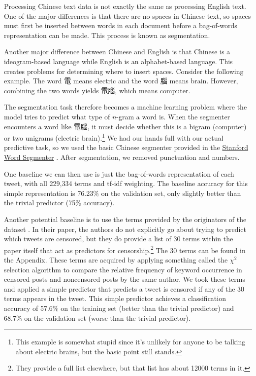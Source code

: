 \documentclass{sig-alternate-05-2015}
\begin{document}
Processing Chinese text data is not exactly the same as processing English text. One of the major differences is that there are no spaces in Chinese text, so spaces must first be inserted between words in each document before a bag-of-words representation can be made. This process is known as segmentation. 

Another major difference between Chinese and English is that Chinese is a ideogram-based language while English is an alphabet-based language. This creates problems for determining where to insert spaces. Consider the following example. The word 電 means electric and the word 腦 means brain. However, combining the two words yields 電腦, which means computer.

The segmentation task therefore becomes a machine learning problem where the model tries to predict what type of $n$-gram a word is. When the segmenter encounters a word like 電腦, it must decide whether this is a bigram (computer) or two unigrams (electric brain).\footnote{This example is somewhat stupid since it's unlikely for anyone to be talking about electric brains, but the basic point still stands.} We had our hands full with our actual predictive task, so we used the basic Chinese segmenter provided in the \href{http://nlp.stanford.edu/software/segmenter.shtml}{Stanford Word Segmenter} \cite{Chang2008}. After segmentation, we removed punctuation and numbers.

One baseline we can then use is just the bag-of-words representation of each tweet, with all 229,334 terms and tf-idf weighting. The baseline accuracy for this simple representation is 76.23\% on the validation set, only slightly better than the trivial predictor (75\% accuracy).

Another potential baseline is to use the terms provided by the originators of the dataset \cite{Fu2013a}. In their paper, the authors do not explicitly go about trying to predict which tweets are censored, but they do provide a list of 30 terms within the paper itself that act as predictors for censorship.\footnote{They provide a full list elsewhere, but that list has about 12000 terms in it.} The 30 terms can be found in the Appendix. These terms are acquired by applying something called the $\chi^2$ selection algorithm to compare the relative frequency of keyword occurrence in censored posts and noncensored posts by the same author. We took these terms and applied a simple predictor that predicts a tweet is censored if any of the 30 terms appears in the tweet. This simple predictor achieves a classification accuracy of 57.6\% on the training set (better than the trivial predictor) and 68.7\% on the validation set (worse than the trivial predictor). 
\end{document}
